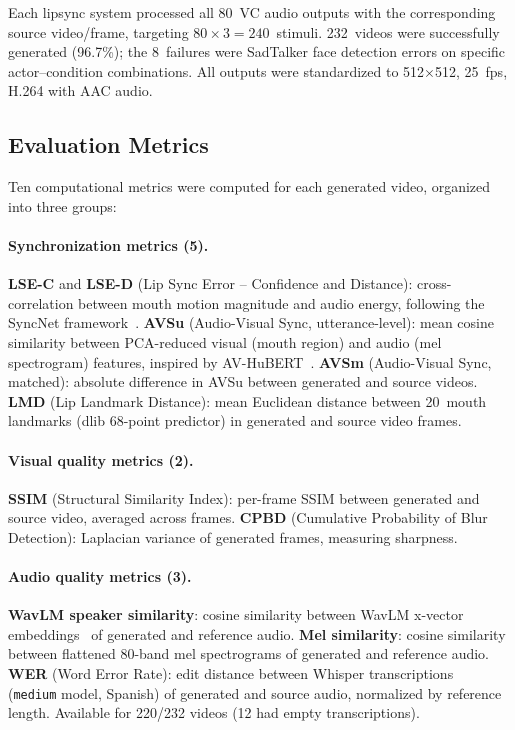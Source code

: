 \documentclass[11pt,a4paper]{article}
\begin{document}
Each lipsync system processed all 80~VC audio outputs with the corresponding source video/frame, targeting $80 \times 3 = 240$~stimuli.
232~videos were successfully generated (96.7\%); the 8~failures were SadTalker face detection errors on specific actor--condition combinations.
All outputs were standardized to 512$\times$512, 25~fps, H.264 with AAC audio.

\subsection{Evaluation Metrics}

Ten computational metrics were computed for each generated video, organized into three groups:

\paragraph{Synchronization metrics (5).}
\textbf{LSE-C} and \textbf{LSE-D} (Lip Sync Error -- Confidence and Distance): cross-correlation between mouth motion magnitude and audio energy, following the SyncNet framework~\citep{chung2017syncnet}.
\textbf{AVSu} (Audio-Visual Sync, utterance-level): mean cosine similarity between PCA-reduced visual (mouth region) and audio (mel spectrogram) features, inspired by AV-HuBERT~\citep{yaman2024avhubert}.
\textbf{AVSm} (Audio-Visual Sync, matched): absolute difference in AVSu between generated and source videos.
\textbf{LMD} (Lip Landmark Distance): mean Euclidean distance between 20~mouth landmarks (dlib 68-point predictor) in generated and source video frames.

\paragraph{Visual quality metrics (2).}
\textbf{SSIM} (Structural Similarity Index): per-frame SSIM between generated and source video, averaged across frames.
\textbf{CPBD} (Cumulative Probability of Blur Detection): Laplacian variance of generated frames, measuring sharpness.

\paragraph{Audio quality metrics (3).}
\textbf{WavLM speaker similarity}: cosine similarity between WavLM x-vector embeddings~\citep{chen2022wavlm} of generated and reference audio.
\textbf{Mel similarity}: cosine similarity between flattened 80-band mel spectrograms of generated and reference audio.
\textbf{WER} (Word Error Rate): edit distance between Whisper transcriptions~\citep{radford2023whisper} (\texttt{medium} model, Spanish) of generated and source audio, normalized by reference length. Available for 220/232 videos (12 had empty transcriptions).
\end{document}

